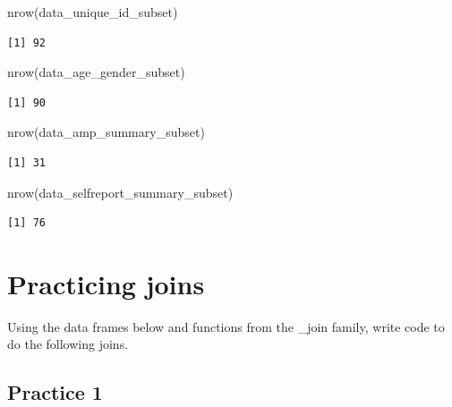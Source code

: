 \documentclass[
  letterpaper,
  DIV=11,
  numbers=noendperiod]{scrreprt}
\newenvironment{Shaded}{\begin{snugshade}}{\end{snugshade}}
\newcommand{\FunctionTok}[1]{\textcolor[rgb]{0.28,0.35,0.67}{#1}}
\newcommand{\NormalTok}[1]{\textcolor[rgb]{0.00,0.23,0.31}{#1}}
\begin{document}
\begin{Shaded}
\begin{Highlighting}[]
\FunctionTok{nrow}\NormalTok{(data\_unique\_id\_subset)}
\end{Highlighting}
\end{Shaded}

\begin{verbatim}
[1] 92
\end{verbatim}

\begin{Shaded}
\begin{Highlighting}[]
\FunctionTok{nrow}\NormalTok{(data\_age\_gender\_subset)}
\end{Highlighting}
\end{Shaded}

\begin{verbatim}
[1] 90
\end{verbatim}

\begin{Shaded}
\begin{Highlighting}[]
\FunctionTok{nrow}\NormalTok{(data\_amp\_summary\_subset)}
\end{Highlighting}
\end{Shaded}

\begin{verbatim}
[1] 31
\end{verbatim}

\begin{Shaded}
\begin{Highlighting}[]
\FunctionTok{nrow}\NormalTok{(data\_selfreport\_summary\_subset)}
\end{Highlighting}
\end{Shaded}

\begin{verbatim}
[1] 76
\end{verbatim}

\section{Practicing joins}\label{practicing-joins}

Using the data frames below and functions from the \_join family, write
code to do the following joins.

\subsection{Practice 1}\label{practice-1}
\end{document}
